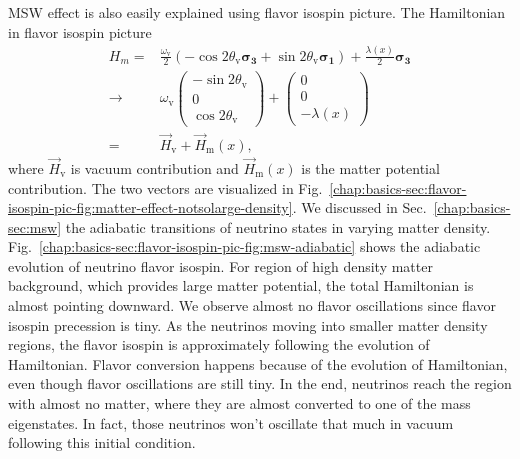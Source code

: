 MSW effect is also easily explained using flavor isospin picture. The Hamiltonian in flavor isospin picture
\begin{align*}
    H_m =& \frac{\omega_{\mathrm{v}}}{2}\left( - \cos 2\theta_{\mathrm{v}} \boldsymbol{\sigma_3} + \sin 2\theta_{\mathrm{v}} \boldsymbol{\sigma_1} \right)   + \frac{\lambda(x)}{2} \boldsymbol{\sigma_3} \\
    \to &  \omega_{\mathrm v}\begin{pmatrix}
    - \sin 2\theta_{\mathrm v} \\
    0 \\
    \cos 2\theta_{\mathrm v}
    \end{pmatrix}   + \begin{pmatrix}
    0\\
    0\\
    - \lambda(x)
    \end{pmatrix}  \\
    = &  \vec H_{\mathrm v} + \vec H_{\mathrm m}(x),
\end{align*}
where $\vec H_{\mathrm v}$ is vacuum contribution and $\vec H_{\mathrm m}(x)$ is the matter potential contribution. The two vectors are visualized in Fig.~\ref{chap:basics-sec:flavor-isospin-pic-fig:matter-effect-notsolarge-density}. We discussed in Sec.~\ref{chap:basics-sec:msw} the adiabatic transitions of neutrino states in varying matter density. Fig.~\ref{chap:basics-sec:flavor-isospin-pic-fig:msw-adiabatic} shows the adiabatic evolution of neutrino flavor isospin. For region of high density matter background, which provides large matter potential, the total Hamiltonian is almost pointing downward. We observe almost no flavor oscillations since flavor isospin precession is tiny. As the neutrinos moving into smaller matter density regions, the flavor isospin is approximately following the evolution of Hamiltonian. Flavor conversion happens because of the evolution of Hamiltonian, even though flavor oscillations are still tiny. In the end, neutrinos reach the region with almost no matter, where they are almost converted to one of the mass eigenstates. In fact, those neutrinos won't oscillate that much in vacuum following this initial condition.



